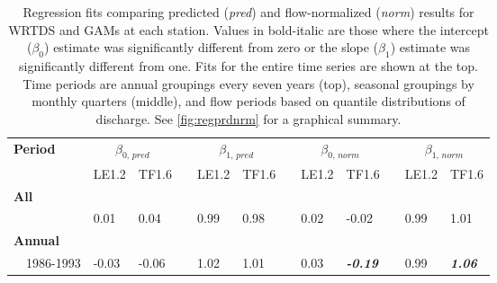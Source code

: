 \documentclass[letterpaper,12pt,oneside]{article}\usepackage[]{graphicx}\usepackage[]{color}
\begin{document}
\begin{table}[!tbp]
\caption{Regression fits comparing predicted ({\it pred}) and flow-normalized ({\it norm}) results for \ac{WRTDS} and \acp{GAM} at each station.  Values in bold-italic are those where the intercept ($\beta_0$) estimate was significantly different from zero or the slope ($\beta_{1}$) estimate was significantly different from one. Fits for the entire time series are shown at the top.  Time periods are annual groupings every seven years (top), seasonal groupings by monthly quarters (middle), and flow periods based on quantile distributions of discharge.  See \cref{fig:regprdnrm} for a graphical summary.\label{tab:regprdnrm}} 
\begin{center}
\begin{tabular}{lllcllcllcll}
\hline\hline
\multicolumn{1}{l}{\bfseries Period}&\multicolumn{2}{c}{\bfseries $\beta_{0,\,pred}$}&\multicolumn{1}{c}{\bfseries }&\multicolumn{2}{c}{\bfseries $\beta_{1,\,pred}$}&\multicolumn{1}{c}{\bfseries }&\multicolumn{2}{c}{\bfseries $\beta_{0,\,norm}$}&\multicolumn{1}{c}{\bfseries }&\multicolumn{2}{c}{\bfseries $\beta_{1,\,norm}$}\tabularnewline
\cline{2-3} \cline{5-6} \cline{8-9} \cline{11-12}
\multicolumn{1}{l}{}&\multicolumn{1}{c}{LE1.2}&\multicolumn{1}{c}{TF1.6}&\multicolumn{1}{c}{}&\multicolumn{1}{c}{LE1.2}&\multicolumn{1}{c}{TF1.6}&\multicolumn{1}{c}{}&\multicolumn{1}{c}{LE1.2}&\multicolumn{1}{c}{TF1.6}&\multicolumn{1}{c}{}&\multicolumn{1}{c}{LE1.2}&\multicolumn{1}{c}{TF1.6}\tabularnewline
\hline
{\bfseries All}&&&&&&&&&&&\tabularnewline
~~&0.01&0.04&&0.99&0.98&&0.02&-0.02&&0.99&1.01\tabularnewline
\hline
{\bfseries Annual}&&&&&&&&&&&\tabularnewline
~~1986-1993&-0.03&-0.06&&1.02&1.01&&0.03&{\bf \textit{-0.19}}&&0.99&{\bf \textit{1.06}}\tabularnewline

\end{tabular}
\end{center}
\end{table}
\end{document}
